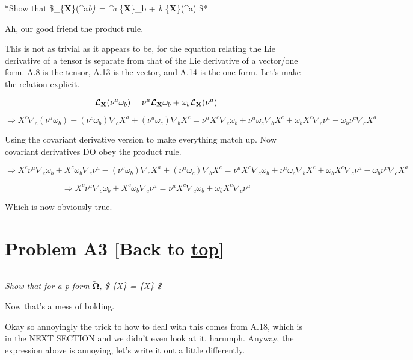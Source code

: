 \documentclass[landscape,letterpaper,10pt,english]{article}
\begin{document}
\[\label{PA2}\]

*Show that \$\_\{\textbf X\}(\nu\^{}a\omega\emph{b) =
\nu\^{}a }\{\textbf X\}\omega\_b + \omega\emph{b
}\{\textbf X\}(\nu\^{}a) \$*

Ah, our good friend the product rule.

This is not as trivial as it appears to be, for the equation relating
the Lie derivative of a tensor is separate from that of the Lie
derivative of a vector/one form. A.8 is the tensor, A.13 is the vector,
and A.14 is the one form. Let's make the relation explicit.

    \[\mathcal{L}_{\textbf X}(\nu^a\omega_b) = \nu^a \mathcal{L}_{\textbf X}\omega_b + \omega_b \mathcal{L}_{\textbf X}(\nu^a) \]

\[\Rightarrow X^c \nabla_c (\nu^a\omega_b) - (\nu^c\omega_b)\nabla_c X^a + (\nu^a\omega_c)\nabla_b X^c = \nu^a X^c \nabla_c \omega_b + \nu^a \omega_c \nabla_b X^c + \omega_b X^c \nabla_c \nu^a  - \omega_b \nu^c \nabla_c X^a \]

Using the covariant derivative version to make everything match up. Now
covariant derivatives DO obey the product rule.

    \[\Rightarrow X^c \nu^a \nabla_c \omega_b + X^c \omega_b \nabla_c \nu^a- (\nu^c\omega_b)\nabla_c X^a + (\nu^a\omega_c)\nabla_b X^c = \nu^a X^c \nabla_c \omega_b + \nu^a \omega_c \nabla_b X^c + \omega_b X^c \nabla_c \nu^a  - \omega_b \nu^c \nabla_c X^a \]

\[\Rightarrow X^c \nu^a \nabla_c \omega_b + X^c \omega_b \nabla_c \nu^a = \nu^a X^c \nabla_c \omega_b  + \omega_b X^c \nabla_c \nu^a  \]

Which is now obviously true.

    \hypertarget{problem-a3-back-to-top}{%
\section{\texorpdfstring{Problem A3 {[}Back to
\hyperref[toc]{top}{]}}{Problem A3 {[}Back to {]}}}\label{problem-a3-back-to-top}}

\[\label{PA3}\]

\emph{Show that for a p-form \(\tilde{\pmb{\Omega}}\), \$
\emph{\{\pmb X\}\tilde{\pmb{\Omega}} =
}\{\pmb X\}\tilde{\pmb{\Omega}} \$}

Now that's a mess of bolding.

    Okay so annoyingly the trick to how to deal with this comes from A.18,
which is in the NEXT SECTION and we didn't even look at it, harumph.
Anyway, the expression above is annoying, let's write it out a little
differently.
\end{document}
